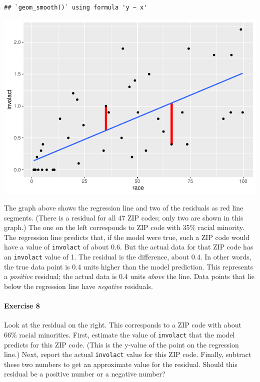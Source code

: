 \documentclass[
]{book}
\begin{document}
\begin{verbatim}
## `geom_smooth()` using formula 'y ~ x'
\end{verbatim}

\includegraphics{intro_stats_files/figure-latex/unnamed-chunk-188-1.pdf}

The graph above shows the regression line and two of the residuals as red line segments. (There is a residual for all 47 ZIP codes; only two are shown in this graph.) The one on the left corresponds to ZIP code with 35\% racial minority. The regression line predicts that, if the model were true, such a ZIP code would have a value of \texttt{involact} of about 0.6. But the actual data for that ZIP code has an \texttt{involact} value of 1. The residual is the difference, about 0.4. In other words, the true data point is 0.4 units higher than the model prediction. This represents a \emph{positive} residual; the actual data is 0.4 units \emph{above} the line. Data points that lie below the regression line have \emph{negative} residuals.

\hypertarget{exercise-8-2}{%
\paragraph*{Exercise 8}\label{exercise-8-2}}

Look at the residual on the right. This corresponds to a ZIP code with about 66\% racial minorities. First, estimate the value of \texttt{involact} that the model predicts for this ZIP code. (This is the y-value of the point on the regression line.) Next, report the actual \texttt{involact} value for this ZIP code. Finally, subtract these two numbers to get an approximate value for the residual. Should this residual be a positive number or a negative number?
\end{document}
